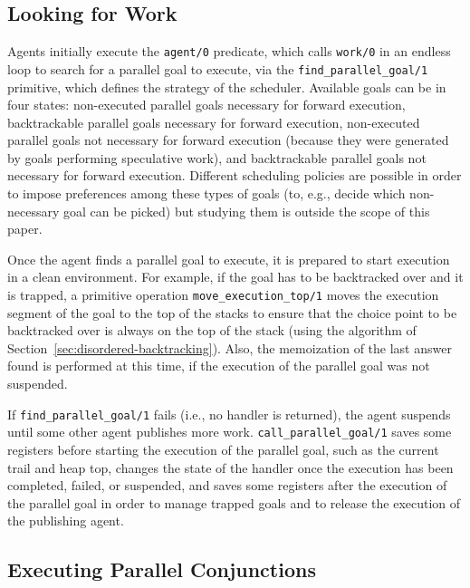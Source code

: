 \documentclass{tlp}
\newcommand{\compressection}{\vspace{-1em}}
\begin{document}
\compressection
\subsection{Looking for Work}
\label{sec:looking-for}

Agents initially execute the \lstinline{agent/0} predicate, which
calls \lstinline{work/0} in an endless loop to search for a parallel
goal to execute, via the \lstinline{find_parallel_goal/1} primitive,
which defines the strategy of the
scheduler.  Available goals can be in four states: non-executed
parallel goals necessary for forward execution, backtrackable parallel
goals necessary for forward execution, non-executed parallel goals not
necessary for forward execution (because they were generated by goals
performing speculative work), and backtrackable parallel goals not
necessary for forward execution.  Different scheduling policies are
possible in order to impose preferences among these types of goals
(to, e.g., decide which non-necessary goal can be picked) but studying
them is outside the scope of this paper.



Once the agent finds a parallel goal to execute, it is prepared to
start execution in a clean environment.
For example, if the goal has to be backtracked over and it is
trapped,
a primitive operation
\lstinline{move_execution_top/1} moves the execution segment of the
goal to the top of the stacks to ensure that the choice point to be
backtracked over is always on the top of the stack
(using the algorithm of Section~\ref{sec:disordered-backtracking}).
Also, the memoization of
the last answer found is performed at this time, if the execution of
the parallel goal was not suspended. 

If \lstinline{find_parallel_goal/1} fails (i.e., no handler is
returned), the agent suspends until some other agent publishes more
work.  \lstinline{call_parallel_goal/1} saves some registers
before starting the execution of the parallel goal, such as the
current trail and heap top, changes the state of the handler once
the execution has been completed, failed, or suspended, and saves some
registers after the execution of the parallel goal in order to manage
trapped goals and to release the execution of the publishing agent.



\compressection
\subsection{Executing Parallel Conjunctions}
\label{sec:exec-par-conj}
\end{document}
